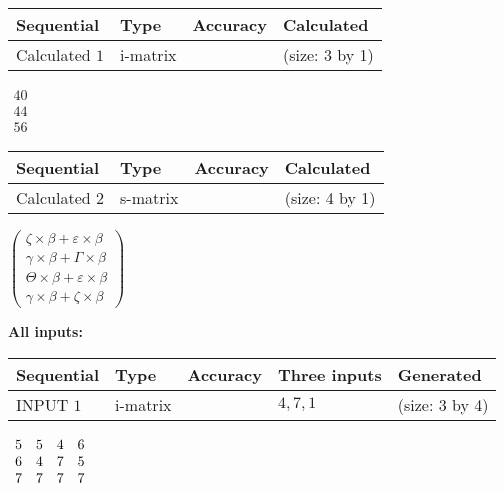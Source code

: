 \documentclass[12pt]{article}
\begin{document}
   
  
  
\noindent\begin{tabular}{|l|l|l|l|}
\hline
 Sequential & Type & Accuracy & Calculated \\ 
\hline
 
 
  Calculated $           1$ & i-matrix &  & 
 (size:           3 by           1)
 \\  \hline  
 \end{tabular}
   
   
$\begin{array}{
 c
 }
          40 \\ 
          44 \\ 
          56
 \end{array}  $ 
  
  
\noindent\begin{tabular}{|l|l|l|l|}
\hline
 Sequential & Type & Accuracy & Calculated \\ 
\hline
 
 
  Calculated $           2$ & s-matrix & & 
 (size:           4 by           1)
 \\  \hline  
 \end{tabular}
   
   
 $   \left( \begin{array}
 {
 c
 }
                    \zeta \times  \beta   +  \varepsilon \times  \beta \\ 
 \gamma \times  \beta   +  \Gamma \times  \beta \\ 
 \Theta \times  \beta   +  \varepsilon \times  \beta \\ 
 \gamma \times  \beta   +                     \zeta \times  \beta
 \end{array} \right) $ 
   
   
\noindent\vspace{0.1in}\hspace{-0.08in} {\textbf{\Large{All inputs: }}}
   
   
  
  
\noindent\begin{tabular}{|l|l|l|l|l|}
\hline
 Sequential & Type & Accuracy & Three inputs & Generated \\ 
\hline
 
 
  INPUT $           1$ & i-matrix &  & $
 4
 , 
 7
 , 
 1
 $ & (size:           3 by           4)
 \\  \hline  
 \end{tabular}
   
   
 $\begin{array}{
 c
 c
 c
 c
 }
           5 & 
           5 & 
           4 & 
           6 \\ 
           6 & 
           4 & 
           7 & 
           5 \\ 
           7 & 
           7 & 
           7 & 
           7
\end{array}  $ 
  
\end{document}
